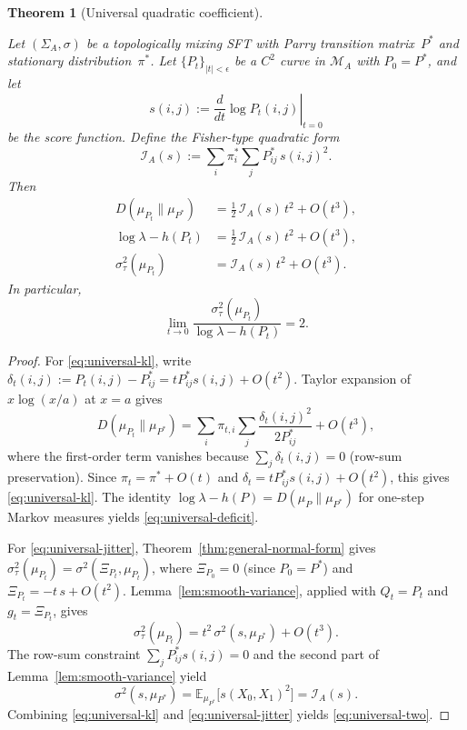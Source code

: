 \documentclass[pdflatex,sn-basic,Numbered]{sn-jnl}
\theoremstyle{thmstyleone}
\newtheorem{theorem}{Theorem}[section]
\theoremstyle{thmstyletwo}
\theoremstyle{thmstylethree}
\newcommand{\EE}{\mathbb{E}}
\newcommand{\leanverified}[1]{}
\begin{document}
\begin{theorem}[Universal quadratic coefficient]\label{thm:universal}
\leanverified{paper_zero_jitter_universal_quadratic_coefficient}
Let $(\Sigma_A,\sigma)$ be a topologically mixing SFT with Parry transition matrix~$P^*$ and stationary distribution~$\pi^*$. Let $\{P_t\}_{|t|<\epsilon}$ be a $C^2$ curve in $\mathcal{M}_A$ with $P_0=P^*$, and let
\[
s(i,j):=\left.\frac{d}{dt}\log P_t(i,j)\right|_{t=0}
\]
be the score function. Define the Fisher-type quadratic form
\[
\mathcal{I}_A(s):=\sum_i\pi^*_i\sum_jP^*_{ij}\,s(i,j)^2.
\]
Then
\begin{align}
D(\mu_{P_t}\|\mu_{P^*})&=\tfrac{1}{2}\,\mathcal{I}_A(s)\,t^2+O(t^3),\label{eq:universal-kl}\\
\log\lambda-h(P_t)&=\tfrac{1}{2}\,\mathcal{I}_A(s)\,t^2+O(t^3),\label{eq:universal-deficit}\\
\sigma_\tau^2(\mu_{P_t})&=\mathcal{I}_A(s)\,t^2+O(t^3).\label{eq:universal-jitter}
\end{align}
In particular,
\begin{equation}\label{eq:universal-two}
\lim_{t\to 0}\frac{\sigma_\tau^2(\mu_{P_t})}{\log\lambda-h(P_t)}=2.
\end{equation}
\end{theorem}

\begin{proof}
For \eqref{eq:universal-kl}, write $\delta_t(i,j):=P_t(i,j)-P^*_{ij}=tP^*_{ij}s(i,j)+O(t^2)$. Taylor expansion of $x\log(x/a)$ at $x=a$ gives
\[
D(\mu_{P_t}\|\mu_{P^*})=\sum_i\pi_{t,i}\sum_j\frac{\delta_t(i,j)^2}{2P^*_{ij}}+O(t^3),
\]
where the first-order term vanishes because $\sum_j\delta_t(i,j)=0$ (row-sum preservation). Since $\pi_t=\pi^*+O(t)$ and $\delta_t=tP^*_{ij}s(i,j)+O(t^2)$, this gives \eqref{eq:universal-kl}. The identity $\log\lambda-h(P)=D(\mu_P\|\mu_{P^*})$ for one-step Markov measures yields \eqref{eq:universal-deficit}.

For \eqref{eq:universal-jitter}, Theorem~\ref{thm:general-normal-form} gives $\sigma_\tau^2(\mu_{P_t})=\sigma^2(\Xi_{P_t},\mu_{P_t})$, where $\Xi_{P_0}=0$ (since $P_0=P^*$) and $\Xi_{P_t}=-t\,s+O(t^2)$. Lemma~\ref{lem:smooth-variance}, applied with $Q_t=P_t$ and $g_t=\Xi_{P_t}$, gives
\[
\sigma_\tau^2(\mu_{P_t})=t^2\,\sigma^2(s,\mu_{P^*})+O(t^3).
\]
The row-sum constraint $\sum_jP^*_{ij}s(i,j)=0$ and the second part of Lemma~\ref{lem:smooth-variance} yield
\[
\sigma^2(s,\mu_{P^*})=\EE_{\mu_{P^*}}\bigl[s(X_0,X_1)^2\bigr]=\mathcal{I}_A(s).
\]
Combining \eqref{eq:universal-kl} and \eqref{eq:universal-jitter} yields \eqref{eq:universal-two}.
\end{proof}
\end{document}
